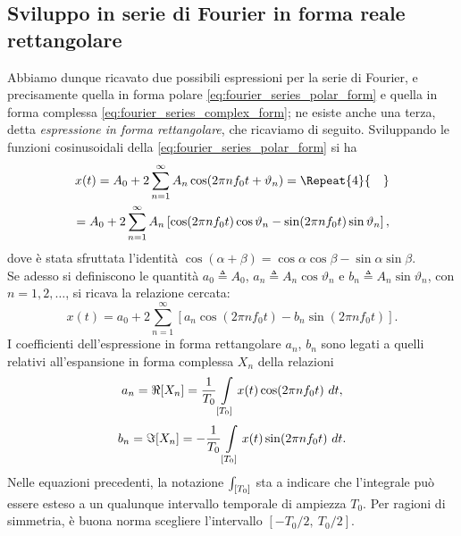 \documentclass[12pt,oneside,openany]{memoir}
\numberwithin{equation}{subsection}
\newcommand{\quads}[1]{\Repeat{#1}{\quad}}
\newcommand{\dt}{\ dt}
\begin{document}
\subsection{Sviluppo in serie di Fourier in forma reale rettangolare}
Abbiamo dunque ricavato due possibili espressioni per la serie di Fourier, e
precisamente quella in forma polare \eqref{eq:fourier_series_polar_form} e
quella in forma complessa \eqref{eq:fourier_series_complex_form}; ne esiste
anche una terza, detta \textit{espressione in forma rettangolare}, che
ricaviamo di seguito. Sviluppando le funzioni cosinusoidali della
\eqref{eq:fourier_series_polar_form} si ha
\begin{equation}
\begin{split}
	x(t) = A_0 + 2 \sum_{n = 1}^{\infty} A_n \cos(2 \pi n f_0 t +
	\vartheta_n) =
	\quads{4}
	\\
	= A_0 + 2 \sum_{n = 1}^{\infty} A_n \left[\cos(2 \pi n f_0 t)
	\cos\vartheta_n - \sin(2 \pi n f_0 t) \sin\vartheta_n\right],
\end{split}
\end{equation}
dove \`e stata sfruttata l'identit\`a
$\cos(\alpha + \beta) = \cos\alpha \cos\beta - \sin\alpha \sin\beta$.\\
Se adesso si definiscono le quantit\`a
$a_0 \triangleq A_0$, $a_n \triangleq A_n \cos\vartheta_n$ e
$b_n \triangleq A_n \sin\vartheta_n$, con $n = 1, 2, \dots$,
si ricava la relazione cercata:
\begin{equation}
	x(t) = a_0 + 2 \sum_{n = 1}^{\infty} \left[a_n \cos(2 \pi n f_0 t) -
	b_n \sin(2 \pi n f_0 t)\right].
\end{equation}
I coefficienti dell'espressione in forma rettangolare $a_n$, $b_n$ sono legati a
quelli relativi all'espansione in forma complessa $X_n$ della relazioni
\begin{equation}
	a_n = \Re[X_n] = \frac{1}{T_0} \int\displaylimits_{[T_0]} x(t)
	\cos(2 \pi n f_0 t) \dt,
\end{equation}
\begin{equation}
	b_n = \Im[X_n] = -\frac{1}{T_0} \int\displaylimits_{[T_0]} x(t)
	\sin(2 \pi n f_0 t) \dt.
\end{equation}
Nelle equazioni precedenti, la notazione $\int\displaylimits_{[T_0]}$ sta a
indicare che l'integrale pu\`o essere esteso a un qualunque intervallo temporale
di ampiezza $T_0$. Per ragioni di simmetria, \`e buona norma scegliere
l'intervallo $[-T_0/2, \ T_0/2]$.

\end{document}
